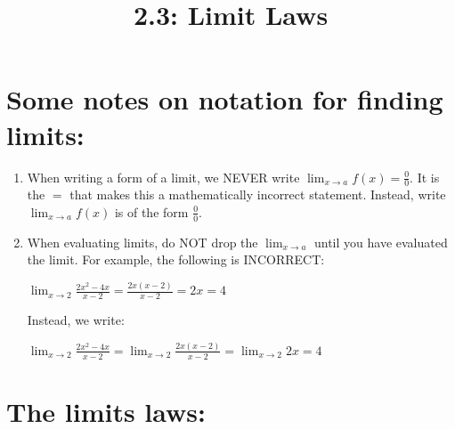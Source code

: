 \documentclass[nooutcomes,handout]{ximera}
\title{2.3:  Limit Laws}
\begin{document}
\begin{abstract}		\end{abstract}
\maketitle

\section{Some notes on notation for finding limits:}
\begin{enumerate}
	\item When writing a form of a limit, we NEVER write $\lim_{x \to a}f(x)=\frac{0}{0}$.  It is the $=$ that makes this a mathematically incorrect statement.  Instead, write $\lim_{x \to a}f(x)$ is of the form $\frac{0}{0}$.

	\item When evaluating limits, do NOT drop the $\lim_{x \to a}$ until you have evaluated the limit.  For example, the following is INCORRECT:
	\begin{center}
	$\lim_{x \to 2}\frac{2x^2-4x}{x-2}=\frac{2x(x-2)}{x-2}=2x=4$\\	
	\end{center}

	Instead, we write: 
		\begin{center}
	$\lim_{x \to 2}\frac{2x^2-4x}{x-2}=\lim_{x \to 2}\frac{2x(x-2)}{x-2}=\lim_{x \to 2}2x=4$\\	
	\end{center}

\end{enumerate}

 \section{The limits laws:}
  
\end{document}
